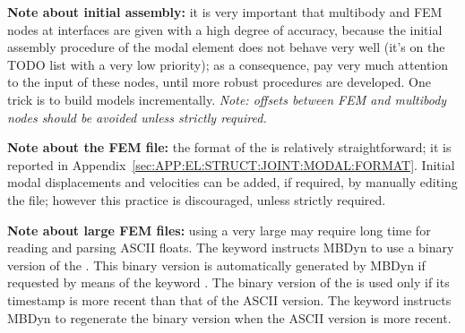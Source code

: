 \textbf{Note about initial assembly:} it is very important that multibody 
and FEM nodes at interfaces are given with a high degree of accuracy,
because the initial assembly procedure of the modal element
does not behave very well (it's on the TODO list with a very low
priority); as a consequence, pay very much attention to the input
of these nodes, until more robust procedures are developed.
One trick is to build models incrementally.
\emph{Note: offsets between FEM and multibody nodes 
should be avoided unless strictly required.}

\textbf{Note about the FEM file:}
the format of the  is relatively straightforward;
it is reported
in Appendix~\ref{sec:APP:EL:STRUCT:JOINT:MODAL:FORMAT}.
Initial modal displacements and velocities can be added,
if required, by manually editing the file; however this practice
is discouraged, unless strictly required.


\textbf{Note about large FEM files:}
using a very large  may require long time for
reading and parsing ASCII floats.
The keyword  instructs MBDyn to use a binary version
of the .
This binary version is automatically generated by MBDyn if requested
by means of the keyword .
The binary version of the  is used only if its
timestamp is more recent than that of the ASCII version.
The keyword  instructs MBDyn to regenerate the
binary version when the ASCII version is more recent.

